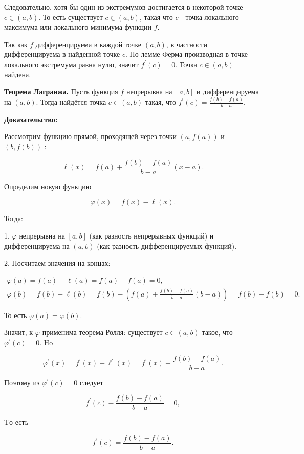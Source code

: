 Следовательно, хотя бы один из экстремумов достигается в некоторой точке $c \in(a, b)$. То есть существует $c \in(a, b)$, такая что $c$ - точка локального максимума или локального минимума функции $f$.

Так как $f$ дифференцируема в каждой точке $(a, b)$, в частности дифференцируема в найденной точке $c$. По лемме Ферма производная в точке локального экстремума равна нулю, значит $f^{\prime}(c)=0.$ Точка $c \in(a, b)$ найдена.

\textbf{Теорема Лагранжа.}
Пусть функция $f$ непрерывна на $[a, b]$ и дифференцируема на $(a, b)$. Тогда найдётся точка $c \in(a, b)$ такая, что $f^{\prime}(c)=\frac{f(b)-f(a)}{b-a}$.

\newpage

\hspace{3mm}

\textbf{Доказательство:}

Рассмотрим функцию прямой, проходящей через точки $(a, f(a))$ и $(b, f(b))$ :

$$
\ell(x)=f(a)+\frac{f(b)-f(a)}{b-a}(x-a) .
$$


Определим новую функцию

$$
\varphi(x)=f(x)-\ell(x) .
$$


Тогда:

1. $\varphi$ непрерывна на $[a, b]$ (как разность непрерывных функций) и дифференцируема на $(a, b)$ (как разность дифференцируемых функций).

2. Посчитаем значения на концах:

$$
\begin{gathered}
\varphi(a)=f(a)-\ell(a)=f(a)-f(a)=0, \\
\varphi(b)=f(b)-\ell(b)=f(b)-\left(f(a)+\frac{f(b)-f(a)}{b-a}(b-a)\right)=f(b)-f(b)=0 .
\end{gathered}
$$


То есть $\varphi(a)=\varphi(b)$.

Значит, к $\varphi$ применима теорема Ролля: существует $c \in(a, b)$ такое, что $\varphi^{\prime}(c)=0.$ Ho

$$
\varphi^{\prime}(x)=f^{\prime}(x)-\ell^{\prime}(x)=f^{\prime}(x)-\frac{f(b)-f(a)}{b-a} .
$$


Поэтому из $\varphi^{\prime}(c)=0$ следует

$$
f^{\prime}(c)-\frac{f(b)-f(a)}{b-a}=0,
$$


Tо есть

$$
f^{\prime}(c)=\frac{f(b)-f(a)}{b-a} .
$$

\newpage

